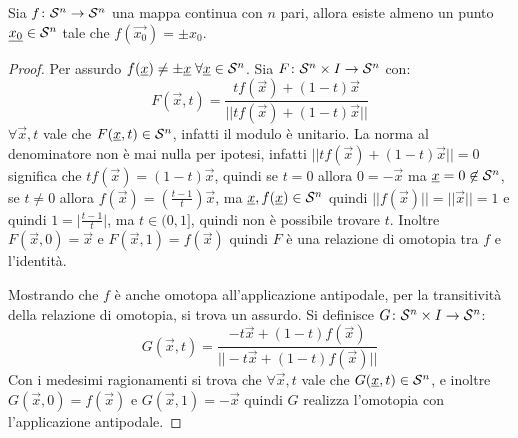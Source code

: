 \begin{corollary}
  Sia $ f \colon \mathcal{S}^{n} \to \mathcal{S}^{n} $ una mappa continua con $ n $ pari, allora esiste almeno
  un punto $ \underline{x_0} \in \mathcal{S}^{n} $ tale che $ f(\vec{x_0}) = \pm x_0 $.
\end{corollary}
\begin{proof}
  Per assurdo $ f(\underline{x}) \not = \pm \underline{x} \; \forall \underline{x} \in \mathcal{S}^{n} $. Sia $ F \colon \mathcal{S}^{n} \times I \to \mathcal{S}^{n} $
  con:
  \[
    F(\vec{x}, t) = \frac{t f(\vec{x}) + (1-t)\vec{x}}{|| t f(\vec{x}) + (1-t)\vec{x} ||}
  \]
  $ \forall \vec{x}, t $ vale che $ F(\underline{x}, t) \in \mathcal{S}^{n} $, infatti il modulo è
  unitario. La norma al denominatore non è mai nulla per ipotesi, infatti
  $ || t f(\vec{x}) + (1-t) \vec{x} || = 0 $ significa che
  $ t f(\vec{x}) = (1-t)\vec{x} $, quindi se $ t = 0 $ allora $ 0 = - \vec{x} $
  ma $ \underline{x} = 0 \not \in \mathcal{S}^{n} $, se $ t \not = 0 $ allora
  $ f(\vec{x}) = \left(\frac{t-1}{t}\right)\vec{x} $, ma
  $ \underline{x}, f(\underline{x}) \in \mathcal{S}^{n} $ quindi
  $ || f(\vec{x}) || = || \vec{x} || = 1 $ e quindi
  $ 1 = \big \rvert \frac{t-1}{t}\big \lvert $, ma $ t \in (0,1] $, quindi non è
  possibile trovare $ t $. Inoltre $ F(\vec{x}, 0) = \vec{x} $ e
  $ F(\vec{x}, 1) = f(\vec{x}) $ quindi $ F $ è una relazione di omotopia tra
  $ f $ e l'identità.

  Mostrando che $ f $ è anche omotopa all'applicazione antipodale, per la
  transitività della relazione di omotopia, si trova un assurdo. Si definisce
  $ G\colon \mathcal{S}^{n} \times I \to \mathcal{S}^{n} $:
  \[
    G(\vec{x}, t) = \frac{-t \vec{x} + (1-t)f(\vec{x})}{|| -t \vec{x} + (1-t)f(\vec{x}) ||}
  \]
  Con i medesimi ragionamenti si trova che $ \forall \vec{x}, t $ vale che
  $ G(\underline{x}, t) \in \mathcal{S}^{n} $, e inoltre $ G(\vec{x}, 0) = f(\vec{x}) $ e
  $ G(\vec{x}, 1) = - \vec{x} $ quindi $ G $ realizza l'omotopia con
  l'applicazione antipodale.
\end{proof}



